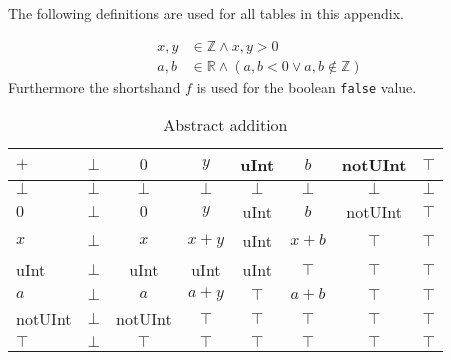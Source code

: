The following definitions are used for all tables in this appendix.

\begin{align*}
x, y &\in \mathbb{Z} \wedge x, y > 0 \\
a, b &\in \mathbb{R} \wedge (a, b < 0 \vee a, b \notin \mathbb{Z})
\end{align*}
Furthermore the shortshand $f$ is used for the boolean \texttt{false} value.

\begin{table}[htbp]
\centering
\begin{tabular}{l| c c c c c c c}
$+$     & $\bot$& $0$       & $y$   & uInt  & $b$   & notUInt   & $\top$ \\
\hline
$\bot$  & $\bot$& $\bot$    & $\bot$& $\bot$& $\bot$& $\bot$    & $\bot$ \\
$0$     & $\bot$& $0$       & $y$   & uInt  & $b$   & notUInt   & $\top$ \\
$x$     & $\bot$& $x$       & $x+y$ & uInt  & $x+b$ & $\top$    & $\top$ \\
uInt    & $\bot$& uInt      & uInt  & uInt  & $\top$& $\top$    & $\top$ \\
$a$     & $\bot$& $a$       & $a+y$ & $\top$& $a+b$ & $\top$    & $\top$ \\
notUInt & $\bot$& notUInt   & $\top$& $\top$& $\top$& $\top$    & $\top$ \\
$\top$  & $\bot$& $\top$    & $\top$& $\top$& $\top$& $\top$    & $\top$ \\
\end{tabular}
\caption{Abstract addition}
\label{tab:abstract_addition}
\end{table}

